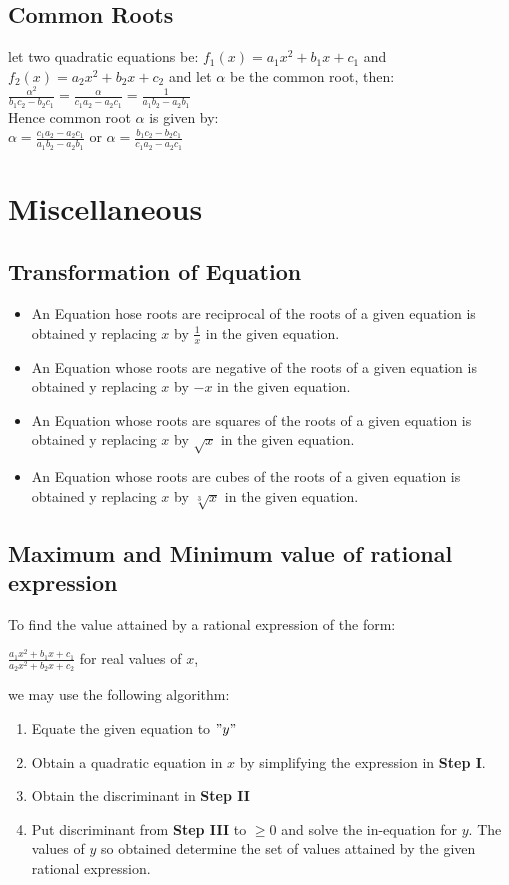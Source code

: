 \documentclass[11pt,a4paper,landscape]{article}
\begin{document}
\begin{multicols*}{3}
	\subsection{Common Roots}
	let two quadratic equations be:	$f_1(x)=a_1x^2+b_1x+c_1$ and $f_2(x)=a_2x^2+b_2x+c_2$ and let $\alpha$ be the common root, then:\\
	$\displaystyle{\frac{\alpha^2}{b_1c_2-b_2c_1}=\frac{\alpha}{c_1a_2-a_2c_1}=\frac{1}{a_1b_2-a_2b_1}}$\\
	
	Hence common root $\alpha$ is given by:\\

	$\displaystyle{\alpha=\frac{c_1a_2-a_2c_1}{a_1b_2-a_2b_1}}$ or $\displaystyle{\alpha=\frac{b_1c_2-b_2c_1}{c_1a_2-a_2c_1}}$
	
\section{Miscellaneous}
	\subsection{Transformation of Equation}
	\begin{itemize}
	\item An Equation hose roots are reciprocal of the roots of a given equation is obtained y replacing $x$ by $\displaystyle{\frac{1}{x}}$ in the given equation.
	\item An Equation whose roots are negative of the roots of a given equation is obtained y replacing $x$ by $-x$ in the given equation.
	\item An Equation whose roots are squares of the roots of a given equation is obtained y replacing $x$ by $\sqrt{x}$ in the given equation.
	\item An Equation whose roots are cubes of the roots of a given equation is obtained y replacing $x$ by $\sqrt[3]{x}$ in the given equation.
	\end{itemize}
	\subsection{Maximum and Minimum value of rational expression}
	To find the value attained by a rational expression of the form:
	\begin{center}
	$\frac{a_1x^2+b_1x+c_1}{a_2x^2+b_2x+c_2}$ for real values of $x$,
	\end{center}
	we may use the following algorithm:
	\renewcommand{\theenumi}{\Roman{enumi}}%
	\begin{enumerate}
	\item Equate the given equation to $"y"$
	\item Obtain a quadratic equation in $x$ by simplifying the expression in \textbf{Step I}.
	\item Obtain the discriminant in \textbf{Step II}
	\item Put discriminant from \textbf{Step III} to $\geq 0$ and solve the in-equation for $y$. The values of $y$ so obtained determine the set of values attained by the given rational expression.
	\end{enumerate}
	

\end{multicols*}
\end{document}
